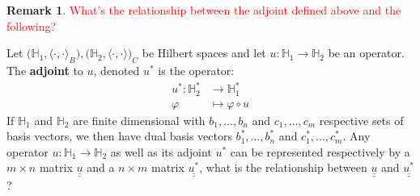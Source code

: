 \documentclass[12pt]{article}
\theoremstyle{plain}
\theoremstyle{definition}
\newtheorem{remark}[thm]{Remark}
\def\doubleunderline#1{\underline{\underline{#1}}}
\newcommand{\bb}[1]{\mathbb{#1}}
\newcommand{\lto}{\longrightarrow}
\begin{document}
\begin{remark}
\textcolor{red}{What's the relationship between the adjoint defined above and the following?}

Let $\big(\bb{H}_1,\langle\cdot,\cdot\rangle_B\big), \big(\bb{H}_2,\langle \cdot, \cdot \rangle\big)_C$ be Hilbert spaces and let $u: \bb{H}_1 \lto \bb{H}_2$ be an operator. The \textbf{adjoint} to $u$, denoted $u^\ast$ is the operator:
\begin{align}
    u^\ast: \bb{H}_2^\ast &\lto \bb{H}_1^\ast\\
    \varphi &\longmapsto \varphi \circ u
\end{align}
If $\bb{H}_1$ and $\bb{H}_2$ are finite dimensional with $b_1,...,b_n$ and $c_1,...,c_m$ respective sets of basis vectors, we then have dual basis vectors $b_1^\ast,...,b_n^\ast$ and $c_1^\ast,...,c_m^\ast$. Any operator $u: \bb{H}_1 \lto \bb{H}_2$ as well as its adjoint $u^\ast$ can be represented respectively by a $m \times n$ matrix $\doubleunderline{u}$ and a $n \times m$ matrix $\doubleunderline{u^\ast}$, what is the relationship between $\doubleunderline{u}$ and $\doubleunderline{u^\ast}$?
\end{remark}
\end{document}
